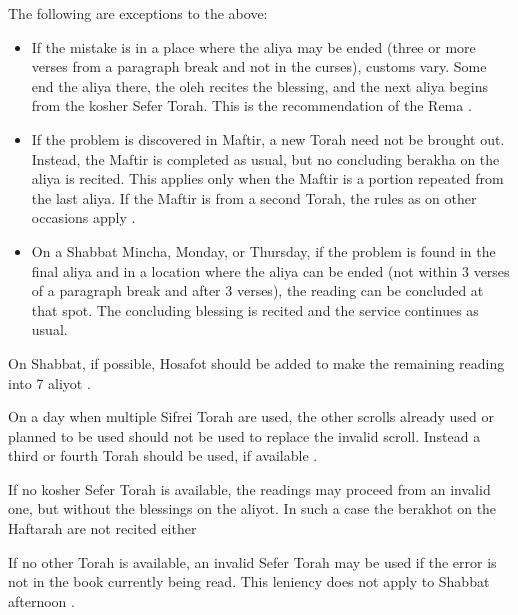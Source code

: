 The following are exceptions to the above:

\begin{itemize}
	\item If the mistake is in a place where the aliya may be ended (three or more verses from a paragraph break and not in the curses), customs vary. Some end the aliya there, the oleh recites the blessing, and the next aliya begins from the kosher Sefer Torah.  This is the recommendation of the Rema \parencite*[22:2 citing OC 146]{PH}.
	\item If the problem is discovered in Maftir, a new Torah need not be brought out.  Instead, the Maftir is completed as usual, but no concluding berakha on the aliya is recited.  This applies only when the Maftir is a portion repeated from the last aliya.  If the Maftir is from a second Torah, the rules as on other occasions apply \parencite*[78:8]{Kitzur}.
	\item On a Shabbat Mincha, Monday, or Thursday, if the problem is found in the final aliya and in a location where the aliya can be ended (not within 3 verses of a paragraph break and after 3 verses), the reading can be concluded at that spot.  The concluding blessing is recited and the service continues as usual.
\end{itemize}

On Shabbat, if possible, Hosafot should be added to make the remaining reading into 7 aliyot \parencite*[24:7]{Kitzur}.

On a day when multiple Sifrei Torah are used, the other scrolls already used or planned to be used should not be used to replace the invalid scroll.  Instead a third or fourth Torah should be used, if available \parencite*[78:10]{Kitzur}.

If no kosher Sefer Torah is available, the readings may proceed from an invalid one, but without the blessings on the aliyot.  In such a case the berakhot on the Haftarah are not recited either \parencite*[79:10]{Kitzur}

If no other Torah is available, an invalid Sefer Torah may be used if the error is not in the book currently being read.  This leniency does not apply to Shabbat afternoon \parencite*[24:10]{Kitzur}.